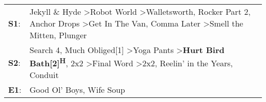 \begin{supertabular}{p{0.03\textwidth}p{0.92\textwidth}}
 \textbf{S1}:  &  Jekyll \& Hyde\textsuperscript{} \textgreater \enspace Robot World\textsuperscript{} \textgreater \enspace Walletsworth\textsuperscript{}, \enspace Rocker Part 2\textsuperscript{}, \enspace Anchor Drops\textsuperscript{} \textgreater \enspace Get In The Van\textsuperscript{}, \enspace Comma Later\textsuperscript{} \textgreater \enspace Smell the Mitten\textsuperscript{}, \enspace Plunger\textsuperscript{}  \enspace  \\
 \textbf{S2}:  &         Search 4\textsuperscript{}, \enspace Much Obliged[1]\textsuperscript{} \textgreater \enspace Yoga Pants\textsuperscript{} \textgreater \enspace \textbf{Hurt Bird Bath[2]\textsuperscript{H}}, \enspace 2x2\textsuperscript{} \textgreater \enspace Final Word\textsuperscript{} \textgreater \enspace 2x2\textsuperscript{}, \enspace Reelin' in the Years\textsuperscript{}, \enspace Conduit\textsuperscript{}  \enspace  \\
 \textbf{E1}:  &                                                                                                                                                                                                                                                                                                                                                     Good Ol' Boys\textsuperscript{}, \enspace Wife Soup\textsuperscript{}  \enspace  \\
\end{supertabular}
